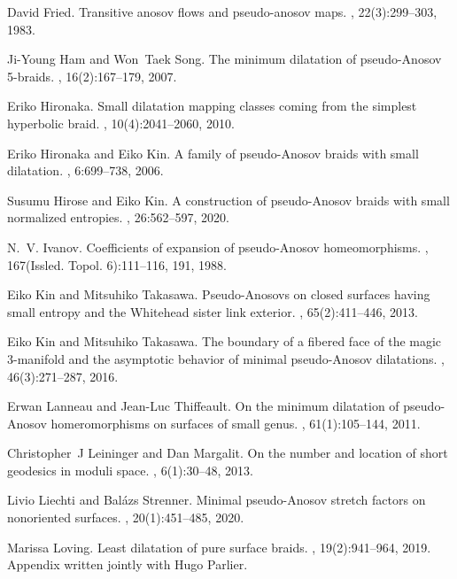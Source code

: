\documentclass[microtype]{gtpart}     %
\theoremstyle{definition}
\theoremstyle{definition}
\theoremstyle{definition}
\theoremstyle{remark}
\theoremstyle{definition}
\begin{document}
\begin{thebibliography}{10}
David Fried.
\newblock Transitive anosov flows and pseudo-anosov maps.
, 22(3):299--303, 1983.

Ji-Young Ham and Won~Taek Song.
\newblock The minimum dilatation of pseudo-{A}nosov 5-braids.
, 16(2):167--179, 2007.

Eriko Hironaka.
\newblock Small dilatation mapping classes coming from the simplest hyperbolic
  braid.
, 10(4):2041--2060, 2010.

Eriko Hironaka and Eiko Kin.
\newblock A family of pseudo-{A}nosov braids with small dilatation.
, 6:699--738, 2006.

Susumu Hirose and Eiko Kin.
\newblock A construction of pseudo-{A}nosov braids with small normalized
  entropies.
, 26:562--597, 2020.

N.~V. Ivanov.
\newblock Coefficients of expansion of pseudo-{A}nosov homeomorphisms.
,
  167(Issled. Topol. 6):111--116, 191, 1988.

Eiko Kin and Mitsuhiko Takasawa.
\newblock Pseudo-{A}nosovs on closed surfaces having small entropy and the
  {W}hitehead sister link exterior.
, 65(2):411--446, 2013.

Eiko Kin and Mitsuhiko Takasawa.
\newblock The boundary of a fibered face of the magic 3-manifold and the
  asymptotic behavior of minimal pseudo-{A}nosov dilatations.
, 46(3):271--287, 2016.

Erwan Lanneau and Jean-Luc Thiffeault.
\newblock On the minimum dilatation of pseudo-{A}nosov homeromorphisms on
  surfaces of small genus.
, 61(1):105--144, 2011.

Christopher~J Leininger and Dan Margalit.
\newblock On the number and location of short geodesics in moduli space.
, 6(1):30--48, 2013.

Livio Liechti and Bal\'{a}zs Strenner.
\newblock Minimal pseudo-{A}nosov stretch factors on nonoriented surfaces.
, 20(1):451--485, 2020.

Marissa Loving.
\newblock Least dilatation of pure surface braids.
, 19(2):941--964, 2019.
\newblock Appendix written jointly with Hugo Parlier.


\end{thebibliography}
\end{document}
